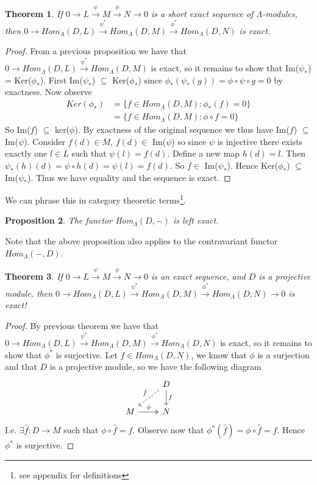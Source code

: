 \documentclass[12pt]{book}
\newtheorem{theorem}{Theorem}[chapter]
\newtheorem{proposition}[theorem]{Proposition}
\theoremstyle{definition}
\begin{document}
\begin{theorem}
    If $0 \rightarrow L \xrightarrow{\psi} M \xrightarrow{\phi} N \rightarrow 0$ is a short exact sequence of $\Lambda$-modules, then $0 \rightarrow Hom_\Lambda(D,L) \xrightarrow{\psi^*} Hom_\Lambda(D,M) \xrightarrow{\phi^*} Hom_\Lambda(D,N)$ is exact. 
\end{theorem}
\begin{proof}
    From a previous proposition we have that  $0 \rightarrow Hom_\Lambda(D,L) \xrightarrow{\psi^*} Hom_\Lambda(D,M)$ is exact, so it remains to show that Im($\psi_*$) = Ker($\phi_*$). 
    First Im($\psi_*$) $\subseteq$ Ker($\phi_*$) since $\phi_*(\psi_*(g)) = \phi \circ \psi \circ g = 0$ by exactness. Now observe 
    \begin{align*}
        Ker(\phi_*) &= \{f \in Hom_\Lambda(D,M): \phi_*(f) = 0\}\\
                    &= \{f \in Hom_\Lambda(D,M): \phi \circ f = 0\}
    \end{align*}
    So Im($f$) $\subseteq$ ker($\phi$). By exactness of the original sequence we thus have Im($f$) $\subseteq$ Im($\psi$). Consider $f(d) \in M$, $f(d) \in$ Im($\psi$) so since $\psi$ is injective there exists exactly one $l \in L$ such that $\psi(l) = f(d)$. Define a new map $h(d) = l$. Then $\psi_*(h)(d) = \psi \circ h (d) = \psi(l) = f(d)$. So $f \in$ Im($\psi_*$). Hence Ker($\phi_*$) $\subseteq$ Im($\psi_*$).
    Thus we have equality and the sequence is exact.
\end{proof}

We can phrase this in category theoretic terms\footnote{see appendix for definitions}. 

\begin{proposition}
    The functor Hom$_\Lambda(D, -)$ is left exact. 
\end{proposition}

Note that the above proposition also applies to the contravariant functor $Hom_\Lambda(-, D)$.

\begin{theorem}
    If $0 \rightarrow L \xrightarrow{\psi} M \xrightarrow{\phi} N \rightarrow 0$ is an exact sequence, and $D$ is a projective module, then $0 \rightarrow Hom_\Lambda(D,L) \xrightarrow{\psi^*} Hom_\Lambda(D,M) \xrightarrow{\phi^*} Hom_\Lambda(D,N) \rightarrow 0$ is exact!
\end{theorem}
\begin{proof}
    By previous theorem we have that $0 \rightarrow Hom_\Lambda(D,L) \xrightarrow{\psi^*} Hom_\Lambda(D,M) \xrightarrow{\phi^*} Hom_\Lambda(D,N)$ is exact, so it remains to show that $\phi^*$ is surjective. Let $f \in Hom_\Lambda(D,N)$, we know that $\phi$ is a surjection and that $D$ is a projective module, so we have the following diagram
    \[
    \begin{tikzcd}
    & D \arrow[ld, dashed, "\hat{f}"'] \arrow[d, "f"] & \\
    M \arrow[r, two heads, "\phi"] & N &
    \end{tikzcd}
    \]
    I.e. $\exists \hat{f}: D \to M$ such that $\phi \circ \hat{f} = f$. Observe now that $\phi^*(\hat{f}) = \phi \circ \hat{f} = f$. Hence $\phi^*$ is surjective. 
\end{proof}
\end{document}
